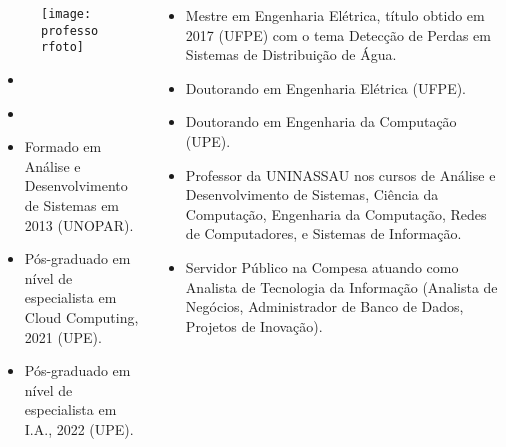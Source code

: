 \begin{frame}[t]

    \begin{columns}[onlytextwidth,T]

        \begin{column}[T]{0.48\linewidth}
            \begin{figure}[htb]
              \centering{}
              \texttt{[image: \\professorfoto]}

              \textbf{\href{\professorlattes}{\professor}}
            \end{figure}

            \begin{itemize}\small
              \justifying{}
              \setlength\itemsep{1ex}
              \item \href{\professorsite}{\professorsite}
              \item \href{\professorlattes}{\professorlattes}
              \item Formado em Análise e Desenvolvimento de Sistemas em 2013 (UNOPAR).
              \item Pós-graduado em nível de especialista em Cloud Computing, 2021 (UPE).
              \item Pós-graduado em nível de especialista em I.A., 2022 (UPE).
            \end{itemize}
        \end{column}

        \begin{column}{0.48\linewidth}
            \small
            \begin{itemize}\small
                \justifying{}
                \setlength\itemsep{1ex}
                \item Mestre em Engenharia Elétrica, título obtido em 2017 (UFPE) com o tema Detecção de Perdas em Sistemas de Distribuição de Água.
                \item Doutorando em Engenharia Elétrica (UFPE).
                \item Doutorando em Engenharia da Computação (UPE).
                \item Professor da UNINASSAU nos cursos de Análise e Desenvolvimento de Sistemas, Ciência da Computação, Engenharia da Computação, Redes de Computadores, e Sistemas de Informação.
                \item Servidor Público na Compesa atuando como Analista de Tecnologia da Informação (Analista de Negócios, Administrador de Banco de Dados, Projetos de Inovação).
            \end{itemize}
        \end{column}

    \end{columns}

\end{frame}

